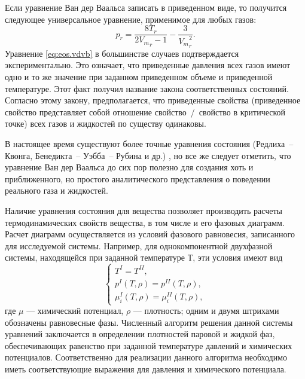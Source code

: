 Если уравнение Ван дер Ваальса записать в приведенном виде, то получится следующее универсальное уравнение, применимое для любых газов:
\begin{equation} \label{eq:eos.vdvb}
	p_r=\dfrac{8 T_r}{2 {V_m}_r-1}-\dfrac{3}{{V_m}_r^2}.
\end{equation}
Уравнение \eqref{eq:eos.vdvb} в большинстве случаев подтверждается экспериментально. Это означает, что приведенные давления всех газов имеют одно и то же значение при заданном приведенном объеме и приведенной температуре. Этот факт получил название закона соответственных состояний. Согласно этому закону, предполагается, что приведенные свойства (приведенное свойство представляет собой отношение свойство / свойство в критической точке) всех газов и жидкостей по существу одинаковы.

В настоящее время существуют более точные уравнения состояния (Редлиха~-- Квонга, Бенедикта~-- Уэбба~-- Рубина и др.) \cite{rid1982,yelles1989}, но все же следует отметить, что уравнение Ван дер Ваальса до сих пор полезно для создания хоть и приближенного, но простого аналитического представления о поведении реального газа и жидкостей.

Наличие уравнения состояния для вещества позволяет производить расчеты термодинамических свойств вещества, в том числе и его фазовых диаграмм. Расчет диаграмм осуществляется из условий фазового равновесия, записанного для исследуемой системы. Например, для однокомпонентной двухфазной системы, находящейся при заданной температуре $Т$, эти условия имеют вид
\begin{equation}\label{eq:oes.equi}
\left\lbrace 
\begin{gathered} 
T^{I}=T^{II},\\
p^{I}(T,\rho)=p^{II}(T,\rho),\\
\mu_i^{I}(T,\rho)=\mu^{II}_i(T,\rho),
\end{gathered} 
\right.
\end{equation}
где $\mu$ --- химический потенциал, $\rho$ --- плотность; одним и двумя штрихами обозначены равновесные фазы. Численный алгоритм решения данной системы уравнений заключается в определении плотностей паровой и жидкой фаз, обеспечивающих равенство при заданной температуре давлений и химических потенциалов. Соответственно для реализации данного алгоритма необходимо иметь соответствующие выражения для давления и химического потенциала.


